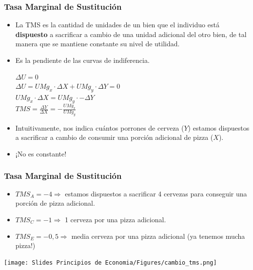 \documentclass{beamer}
\begin{document}
\begin{frame}
\frametitle{Tasa Marginal de Sustitución}

\begin{itemize}
    \item La TMS es la cantidad de unidades de un bien que el individuo está \textbf{dispuesto} a sacrificar a cambio de una unidad adicional del otro bien, de tal manera que se mantiene constante su nivel de utilidad. \vspace{2mm}
    \item Es la pendiente de las curvas de indiferencia. \pause
    \begin{center}
        $\Delta U = 0$ \\  \vspace{2mm}
        $\Delta U = UMg_x \cdot \Delta X + UMg_y \cdot \Delta Y = 0$ \\ \vspace{2mm}
        $ UMg_x \cdot \Delta X = UMg_y \cdot - \Delta Y$ \\ \vspace{2mm}
        $TMS = \frac{\Delta Y}{\Delta X} = - \frac{UMg_x}{UMg_y}$ \vspace{2mm}
    \end{center}   
    \item Intuitivamente, nos indica cuántos porrones de cerveza ($Y$) estamos dispuestos a sacrificar a cambio de consumir una porción adicional de pizza ($X$).
    \item  ¡No es constante!
\end{itemize} 
\end{frame}

\begin{frame}
\frametitle{Tasa Marginal de Sustitución}
\vspace{2mm}
\begin{itemize}
    \item  $TMS_A = -4 \Rightarrow$ estamos dispuestos a sacrificar 4 cervezas para conseguir una porción de pizza adicional.
    \item  $TMS_C = -1 \Rightarrow$ 1 cerveza por una pizza adicional.
    \item  $TMS_E = -0,5 \Rightarrow$ media cerveza por una pizza adicional (ya tenemos mucha pizza!)
\end{itemize} 
\begin{center}
    \texttt{[image: Slides Principios de Economia/Figures/cambio\_tms.png]}
    \end{center}
\end{frame}
\end{document}
